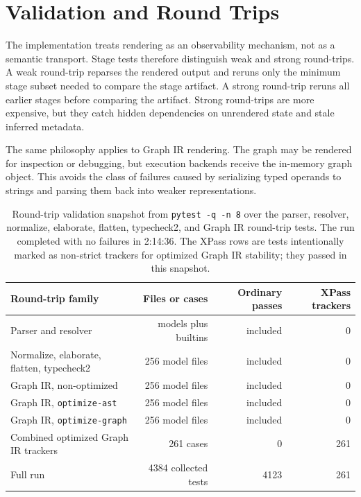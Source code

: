 \documentclass{article}
\newcommand{\code}[1]{\texttt{#1}}
\begin{document}













\section{Validation and Round Trips}

The implementation treats rendering as an observability mechanism, not as a
semantic transport.  Stage tests therefore distinguish weak and strong
round-trips.  A weak round-trip reparses the rendered output and reruns only
the minimum stage subset needed to compare the stage artifact.  A strong
round-trip reruns all earlier stages before comparing the artifact.  Strong
round-trips are more expensive, but they catch hidden dependencies on
unrendered state and stale inferred metadata.

The same philosophy applies to Graph IR rendering.  The graph may be rendered
for inspection or debugging, but execution backends receive the in-memory graph
object.  This avoids the class of failures caused by serializing typed
operands to strings and parsing them back into weaker representations.

\begin{table}[t]
\centering
\begin{tabular}{lrrr}
\toprule
Round-trip family & Files or cases & Ordinary passes & XPass trackers \\
\midrule
Parser and resolver & models plus builtins & included & 0 \\
Normalize, elaborate, flatten, typecheck2 & 256 model files & included & 0 \\
Graph IR, non-optimized & 256 model files & included & 0 \\
Graph IR, \code{optimize-ast} & 256 model files & included & 0 \\
Graph IR, \code{optimize-graph} & 256 model files & included & 0 \\
Combined optimized Graph IR trackers & 261 cases & 0 & 261 \\
\midrule
Full run & 4384 collected tests & 4123 & 261 \\
\bottomrule
\end{tabular}
\caption{Round-trip validation snapshot from
\code{pytest -q -n 8} over the parser, resolver, normalize, elaborate,
flatten, typecheck2, and Graph IR round-trip tests.  The run completed with no
failures in 2:14:36.  The XPass rows are tests intentionally marked as
non-strict trackers for optimized Graph IR stability; they passed in this
snapshot.}
\label{tab:roundtrip}
\end{table}
\end{document}
